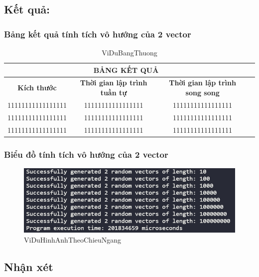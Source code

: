 \newpage
\subsection{Kết quả:}
\subsubsection{Bảng kết quả tính tích vô hướng của 2 vector}


 
 \begin{table}[h] %
 \centering
 \begin{tabular}{|c|c|c|c|}

 \hline
 \multicolumn{3}{|c|}{\textbf{BẢNG KẾT QUẢ}} \\ 
 \hline
 \textbf{Kích thước} & \textbf{Thời gian lập trình tuần tự} & \textbf{Thời gian lập trình song song} \\ \hline
 11111111111111111 & 11111111111111111 & 11111111111111111 \\ \hline
 11111111111111111 & 11111111111111111 & 11111111111111111 \\ \hline
 11111111111111111 & 11111111111111111 & 11111111111111111 \\ \hline
 \end{tabular}

 \caption{ViDuBangThuong} %
 \label{table:nghia123} %
 \end{table} 



\newpage
\subsubsection{Biểu đồ tính tích vô hướng của 2 vector}


 
\begin{figure}[h] %
\centering
\includegraphics[width=1\textwidth]{pictures/image.png} %
\caption{ViDuHinhAnhTheoChieuNgang} %
\label{pictures:nghia1} %
\end{figure} 






\subsection{Nhận xét}
\lipsum[1]